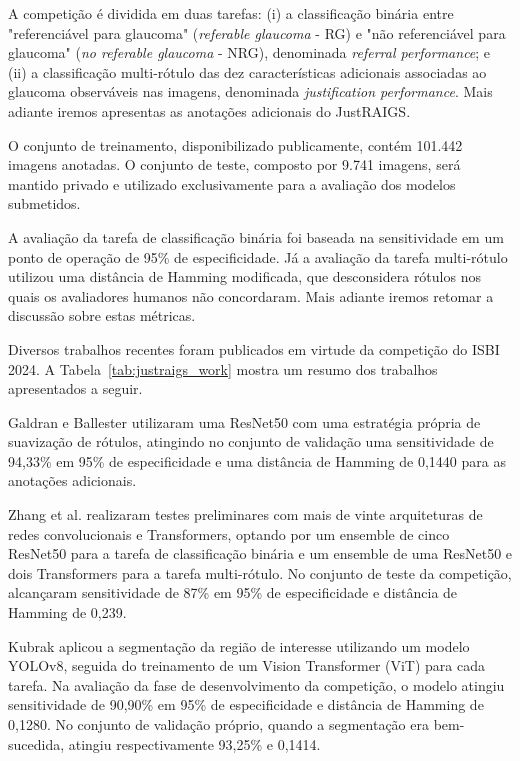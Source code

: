 \documentclass[12pt]{article}
\begin{document}
A competição é dividida em duas tarefas: (i) a classificação binária entre "referenciável para glaucoma" (\textit{referable glaucoma} - RG) e "não referenciável para glaucoma" (\textit{no referable glaucoma} -  NRG), denominada \textit{referral performance}; e (ii) a classificação multi-rótulo das dez características adicionais associadas ao glaucoma observáveis nas imagens, denominada \textit{justification performance}. Mais adiante iremos apresentas as anotações adicionais do JustRAIGS.

O conjunto de treinamento, disponibilizado publicamente, contém 101.442 imagens anotadas. O conjunto de teste, composto por 9.741 imagens, será mantido privado e utilizado exclusivamente para a avaliação dos modelos submetidos.

A avaliação da tarefa de classificação binária foi baseada na sensitividade em um ponto de operação de 95\% de especificidade. Já a avaliação da tarefa multi-rótulo utilizou uma distância de Hamming modificada, que desconsidera rótulos nos quais os avaliadores humanos não concordaram. Mais adiante iremos retomar a discussão sobre estas métricas.

Diversos trabalhos recentes foram publicados em virtude da competição do ISBI 2024. A Tabela~\ref{tab:justraigs_work} mostra um resumo dos trabalhos apresentados a seguir.

Galdran e Ballester \cite{justraigs_galdran} utilizaram uma ResNet50 com uma estratégia própria de suavização de rótulos, atingindo no conjunto de validação uma sensitividade de 94,33\% em 95\% de especificidade e uma distância de Hamming de 0,1440 para as anotações adicionais.

Zhang et al. \cite{justraigs_zhang} realizaram testes preliminares com mais de vinte arquiteturas de redes convolucionais e Transformers, optando por um ensemble de cinco ResNet50 para a tarefa de classificação binária e um ensemble de uma ResNet50 e dois Transformers para a tarefa multi-rótulo. No conjunto de teste da competição, alcançaram sensitividade de 87\% em 95\% de especificidade e distância de Hamming de 0,239.

Kubrak \cite{justraigs_kubrak} aplicou a segmentação da região de interesse utilizando um modelo YOLOv8, seguida do treinamento de um Vision Transformer (ViT) para cada tarefa. Na avaliação da fase de desenvolvimento da competição, o modelo atingiu sensitividade de 90,90\% em 95\% de especificidade e distância de Hamming de 0,1280. No conjunto de validação próprio, quando a segmentação era bem-sucedida, atingiu respectivamente 93,25\% e 0,1414.
\end{document}
